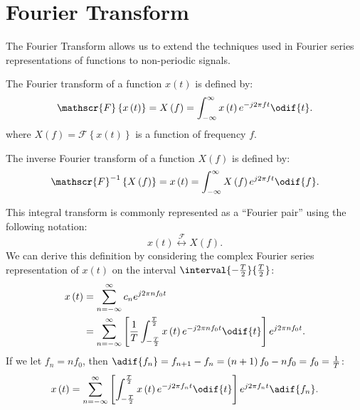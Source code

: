 \documentclass{article}
\begin{document}
\section{Fourier Transform}
The Fourier Transform allows us to extend the techniques used in
Fourier series representations of functions to non-periodic signals.
\begin{definition}
    The Fourier transform of a function \(x\left( t \right)\) is defined by:
    \begin{equation*}
        \mathscr{F}\left\{ x\left( t \right) \right\} = X\left( f \right) = \int_{-\infty}^\infty x\left( t \right) e^{-j 2\pi f t} \odif{t}.
    \end{equation*}
    where \(X\left( f \right) = \mathscr{F}\left\{ x\left( t \right) \right\}\) is a function of frequency \(f\).
\end{definition}
\begin{definition}
    The inverse Fourier transform of a function \(X\left( f \right)\) is defined by:
    \begin{equation*}
        \mathscr{F}^{-1}\left\{ X\left( f \right) \right\} = x\left( t \right) = \int_{-\infty}^\infty X\left( f \right) e^{j 2\pi f t} \odif{f}.
    \end{equation*}
\end{definition}
This integral transform is commonly represented as a ``Fourier pair'' using the following notation:
\begin{equation*}
    x\left( t \right) \overset{\mathscr{F}}{\longleftrightarrow} X\left( f \right).
\end{equation*}
We can derive this definition by considering the complex Fourier series representation of \(x\left( t \right)\)
on the interval \(\interval{-\frac{T}{2}}{\frac{T}{2}}\):
\begin{align*}
    x\left( t \right) & = \sum_{n = -\infty}^\infty c_n e^{j 2\pi n f_0 t}                                                                                                          \\
                      & = \sum_{n = -\infty}^\infty \left[ \frac{1}{T} \int_{-\frac{T}{2}}^{\frac{T}{2}} x\left( t \right) e^{-j 2\pi n f_0 t} \odif{t} \right] e^{j 2\pi n f_0 t}.
\end{align*}
If we let \(f_n = n f_0\), then \(\adif{f_n} = f_{n + 1} - f_n = \left( n + 1 \right)f_0 - n f_0 = f_0 = \frac{1}{T}\):
\begin{equation*}
    x\left( t \right) = \sum_{n = -\infty}^\infty \left[ \int_{-\frac{T}{2}}^{\frac{T}{2}} x\left( t \right) e^{-j 2\pi f_n t} \odif{t} \right] e^{j 2\pi f_n t} \adif{f_n}.
\end{equation*}
\end{document}

